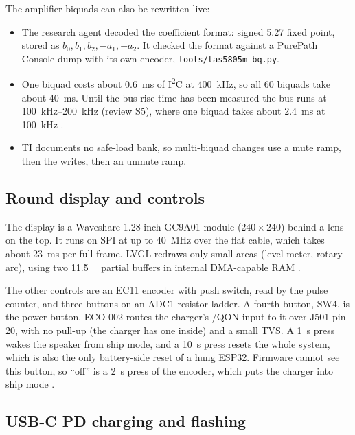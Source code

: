 The amplifier biquads can also be rewritten live:
\begin{itemize}
  \item The research agent decoded the coefficient format: signed 5.27 fixed point, stored as $b_0, b_1, b_2, -a_1, -a_2$. It checked the format against a PurePath Console dump with its own encoder, \texttt{tools/tas5805m\_bq.py}.
  \item One biquad costs about \qty{0.6}{\milli\second} of I\textsuperscript{2}C at \qty{400}{\kilo\hertz}, so all 60 biquads take about \qty{40}{\milli\second}. Until the bus rise time has been measured the bus runs at \qty{100}{\kilo\hertz}--\qty{200}{\kilo\hertz} (review S5), where one biquad takes about \qty{2.4}{\milli\second} at \qty{100}{\kilo\hertz} .
  \item TI documents no safe-load bank, so multi-biquad changes use a mute ramp, then the writes, then an unmute ramp.
\end{itemize}

\subsection{Round display and controls}

The display is a Waveshare 1.28-inch GC9A01 module ($240\times240$) behind a lens on the top. It runs on SPI at up to \qty{40}{\mega\hertz} over the flat cable, which takes about \qty{23}{\milli\second} per full frame. LVGL redraws only small areas (level meter, rotary arc), using two \qty{11.5}{\kilo\byte} partial buffers in internal DMA-capable RAM .

The other controls are an EC11 encoder with push switch, read by the pulse counter, and three buttons on an ADC1 resistor ladder. A fourth button, SW4, is the power button. ECO-002 routes the charger's /QON input to it over J501 pin 20, with no pull-up (the charger has one inside) and a small TVS. A \qty{1}{\second} press wakes the speaker from ship mode, and a \qty{10}{\second} press resets the whole system, which is also the only battery-side reset of a hung ESP32. Firmware cannot see this button, so ``off'' is a \qty{2}{\second} press of the encoder, which puts the charger into ship mode .

\subsection{USB-C PD charging and flashing}

